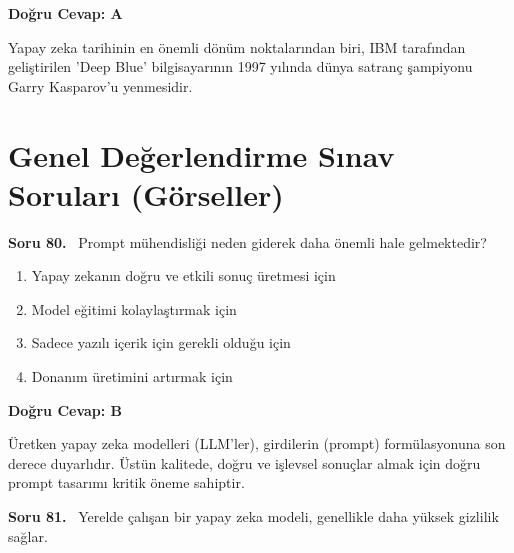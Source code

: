 \documentclass[11pt,a4paper,openany]{book}
\begin{document}
\vspace{4pt}
\begin{tcolorbox}[title=Cevap ve Açıklama, colback=gray!3!white, colframe=primarycolor!90!black, arc=2mm, fonttitle=\bfseries\sffamily, top=6pt, bottom=6pt]
    \textbf{Doğru Cevap: A}

    \vspace{2pt}
    Yapay zeka tarihinin en önemli dönüm noktalarından biri, IBM tarafından geliştirilen 'Deep Blue' bilgisayarının 1997 yılında dünya satranç şampiyonu Garry Kasparov'u yenmesidir.
\end{tcolorbox}
\vspace{10pt}

\chapter{Genel Değerlendirme Sınav Soruları (Görseller)}
\needspace{5cm}
\vspace{8pt}
\noindent\textbf{\large\sffamily Soru 80.} \ Prompt mühendisliği neden giderek daha önemli hale gelmektedir?

\begin{enumerate}[label=\Alph*), leftmargin=25pt, topsep=4pt, itemsep=2pt]
        \item Yapay zekanın doğru ve etkili sonuç üretmesi için
        \item Model eğitimi kolaylaştırmak için
        \item Sadece yazılı içerik için gerekli olduğu için
        \item Donanım üretimini artırmak için
\end{enumerate}

\vspace{4pt}
\begin{tcolorbox}[title=Cevap ve Açıklama, colback=gray!3!white, colframe=primarycolor!90!black, arc=2mm, fonttitle=\bfseries\sffamily, top=6pt, bottom=6pt]
    \textbf{Doğru Cevap: B}

    \vspace{2pt}
    Üretken yapay zeka modelleri (LLM'ler), girdilerin (prompt) formülasyonuna son derece duyarlıdır. Üstün kalitede, doğru ve işlevsel sonuçlar almak için doğru prompt tasarımı kritik öneme sahiptir.
\end{tcolorbox}
\vspace{10pt}
\needspace{5cm}
\vspace{8pt}
\noindent\textbf{\large\sffamily Soru 81.} \ Yerelde çalışan bir yapay zeka modeli, genellikle daha yüksek gizlilik sağlar.
\end{document}
